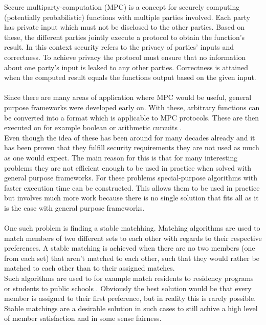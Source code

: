 Secure multiparty-computation (MPC) is a concept for securely computing (potentially probabilistic) functions with multiple parties involved. Each party has private input which must not be disclosed to the other parties. Based on these, the different parties jointly execute a protocol to obtain the function's result. In this context security refers to the privacy of parties' inputs and correctness. To achieve privacy the protocol must ensure that no information about one party's input is leaked to any other parties. Correctness is attained when the computed result equals the functions output based on the given input.\\
\ \\Since there are many areas of application where MPC would be useful, general purpose frameworks were developed early on. With these, arbitrary functions can be converted into a format which is applicable to MPC protocols. These are then executed on for example boolean or arithmetic curcuits .\\ 
Even though the idea of these has been around for many decades already and it has been proven that they fulfill security requirements they are not used as much as one would expect.  The main reason for this is that for many interesting problems they are not efficient enough to be used in practice when solved with general purpose frameworks.  For these problems special-purpose algorithms with faster execution time can be constructed. This allows them to be used in practice but involves much more work because there is no single solution that fits all as it is the case with general purpose frameworks. \\
\ \\One such problem is finding a stable matchhing. Matching algorithms are used to match members of two different sets to each other with regards to their respective preferences. A stable matching is achieved when there are no two members (one from each set) that aren't matched to each other, such that they would rather be matched to each other than to their assigned matches.\\ 
Such algorithms are used to for example match residents to residency programs or students to public schools . Obviously the best solution would be that every member is assigned to their first preference, but in reality this is rarely possible. Stable matchings are a desirable solution in such cases to still achive a high level of member satisfaction and in some sense fairness.\\
